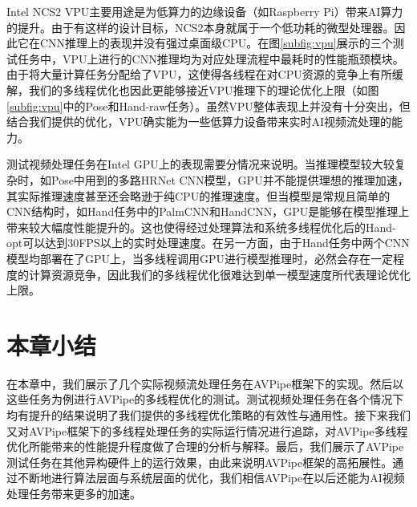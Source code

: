 Intel NCS2 VPU主要用途是为低算力的边缘设备（如Raspberry Pi）带来AI算力的提升。由于有这样的设计目标，NCS2本身就属于一个低功耗的微型处理器。因此它在CNN推理上的表现并没有强过桌面级CPU。在图\ref{subfig:vpu}展示的三个测试任务中，VPU上进行的CNN推理均为对应处理流程中最耗时的性能瓶颈模块。由于将大量计算任务分配给了VPU，这使得各线程在对CPU资源的竞争上有所缓解，我们的多线程优化也因此更能够接近VPU推理下的理论优化上限（如图\ref{subfig:vpu}中的Pose和Hand-raw任务）。虽然VPU整体表现上并没有十分突出，但结合我们提供的优化，VPU确实能为一些低算力设备带来实时AI视频流处理的能力。\par
测试视频处理任务在Intel GPU上的表现需要分情况来说明。当推理模型较大较复杂时，如Pose中用到的多路HRNet CNN模型，GPU并不能提供理想的推理加速，其实际推理速度甚至还会略逊于纯CPU的推理速度。但当模型是常规且简单的CNN结构时，如Hand任务中的PalmCNN和HandCNN，GPU是能够在模型推理上带来较大幅度性能提升的。这也使得经过处理算法和系统多线程优化后的Hand-opt可以达到30FPS以上的实时处理速度。在另一方面，由于Hand任务中两个CNN模型均部署在了GPU上，当多线程调用GPU进行模型推理时，必然会存在一定程度的计算资源竞争，因此我们的多线程优化很难达到单一模型速度所代表理论优化上限。

\section{本章小结}
在本章中，我们展示了几个实际视频流处理任务在AVPipe框架下的实现。然后以这些任务为例进行AVPipe的多线程优化的测试。测试视频处理任务在各个情况下均有提升的结果说明了我们提供的多线程优化策略的有效性与通用性。接下来我们又对AVPipe框架下的多线程处理任务的实际运行情况进行追踪，对AVPipe多线程优化所能带来的性能提升程度做了合理的分析与解释。最后，我们展示了AVPipe测试任务在其他异构硬件上的运行效果，由此来说明AVPipe框架的高拓展性。通过不断地进行算法层面与系统层面的优化，我们相信AVPipe在以后还能为AI视频处理任务带来更多的加速。